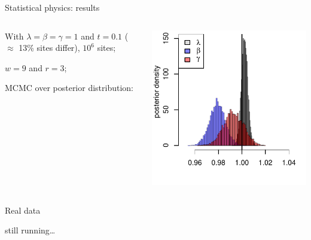 \documentclass[smaller]{beamer}
\begin{document}
\begin{frame}{Statistical physics: results}
  \begin{columns}[c]
    \begin{column}{.4\textwidth}

      With $\lambda = \beta = \gamma = 1$ and $t = 0.1$  ($\approx$ 13\% sites differ), $10^6$ sites; \\

      \vspace{1em}

      $w=9$ and $r=3$;

      \vspace{1em}

      MCMC over posterior distribution:


    \end{column}
    \begin{column}{.6\textwidth}

  \includegraphics[width=\textwidth]{../../../writeup-plots/selsims-2013-05-28-17-12-0275615-estimate-hists}

    \end{column}
  \end{columns}

\end{frame}

\begin{frame}{Real data}

  still running\ldots

\end{frame}
\end{document}
